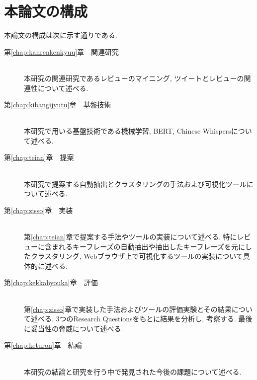 \section{本論文の構成}
本論文の構成は次に示す通りである. 
\begin{description}

\item[第\ref{chap:kanrenkenkyuu}章　関連研究]\mbox{}\\
本研究の関連研究であるレビューのマイニング, ツイートとレビューの関連性について述べる. \\

\item[第\ref{chap:kibangijyutu}章　基盤技術]\mbox{}\\
本研究で用いる基盤技術である機械学習, BERT, Chinese Whispersについて述べる. \\

\item[第\ref{chap:teian}章　提案]\mbox{}\\
本研究で提案する自動抽出とクラスタリングの手法および可視化ツールについて述べる. \\

\item[第\ref{chap:zisso}章　実装]\mbox{}\\
第\ref{chap:teian}章で提案する手法やツールの実装について述べる. 特にレビューに含まれるキーフレーズの自動抽出や抽出したキーフレーズを元にしたクラスタリング, Webブラウザ上で可視化するツールの実装について具体的に述べる. \\

\item[第\ref{chap:kekkahyouka}章　評価]\mbox{}\\
第\ref{chap:zisso}章で実装した手法およびツールの評価実験とその結果について述べる. 3つのResearch Questionsをもとに結果を分析し, 考察する. 最後に妥当性の脅威について述べる. \\

\item[第\ref{chap:keturon}章　結論]\mbox{}\\
本研究の結論と研究を行う中で発見された今後の課題について述べる. \\

\end{description}